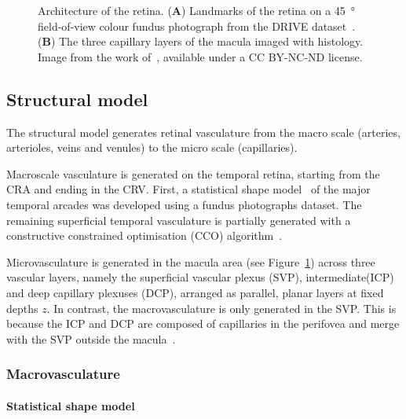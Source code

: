 \documentclass[11pt,]{article}
\begin{document}
\begin{figure}[ht!]
  \caption{Architecture of the retina. (\textbf{A}) Landmarks of the retina on a \SI{45}{\degree} field-of-view colour fundus photograph from the DRIVE dataset~\cite{Staal_2004}.
  (\textbf{B}) The three capillary layers of the macula imaged with histology. Image from the work of~\cite{An2020}, available under a CC BY-NC-ND license.}
  \label{fig:1}
\end{figure}

\subsection{Structural model}\label{sec:structModel}

The structural model generates retinal vasculature from the macro
scale (arteries, arterioles, veins and venules) to the micro scale
(capillaries).

Macroscale vasculature is generated on the temporal retina, starting
from the CRA and ending in the CRV.
First, a statistical shape model~\cite{Davies_2008}
of the major temporal arcades was developed using a fundus
photographs dataset.  The remaining superficial temporal vasculature is
partially generated with a constructive constrained optimisation (CCO)
algorithm~\cite{Talou2021}.

Microvasculature is generated in the macula area (see
Figure~\ref{fig:1}) across three vascular layers, namely the superficial
vascular plexus (SVP), intermediate(ICP) and deep capillary plexuses
(DCP), arranged as parallel, planar layers at fixed depths \(z\).
In contrast, the macrovasculature is only generated in the SVP.
This is because the ICP and DCP are composed of capillaries in the perifovea and merge with the SVP outside the macula~\cite{An2021}.

\subsubsection{Macrovasculature}

\paragraph{Statistical shape model}
\end{document}
